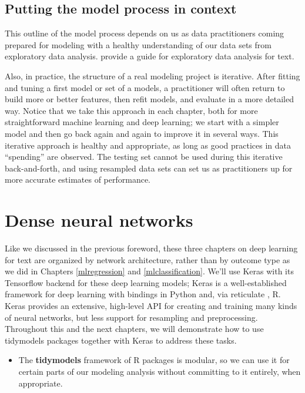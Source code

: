 \documentclass[
]{krantz}
\newenvironment{rmdblock}[1]
  {\begin{shaded*}
  \begin{itemize}[left = -1cm, labelsep = 1cm]
  \renewcommand{\labelitemi}{
    \raisebox{-.7\height}[0pt][0pt]{
      {\setkeys{Gin}{width=3em,keepaspectratio}\texttt{[image: images/\#1]}}
    }
  }
 
  \item
  }
  {
  \end{itemize}
  \end{shaded*}
  }
\newenvironment{rmdpackage}
  {\begin{rmdblock}{package}}
  {\end{rmdblock}}
\begin{document}
\hypertarget{putting-the-model-process-in-context}{%
\section*{Putting the model process in context}\label{putting-the-model-process-in-context}}


This outline of the model process depends on us as data practitioners coming prepared for modeling with a healthy understanding of our data sets from exploratory data analysis. \citet{Silge2017} provide a guide for exploratory data analysis for text.

Also, in practice, the structure of a real modeling project is iterative. After fitting and tuning a first model or set of a models, a practitioner will often return to build more or better features, then refit models, and evaluate in a more detailed way. Notice that we take this approach in each chapter, both for more straightforward machine learning and deep learning; we start with a simpler model and then go back again and again to improve it in several ways. This iterative approach is healthy and appropriate, as long as good practices in data ``spending'' are observed. The testing set cannot be used during this iterative back-and-forth, and using resampled data sets can set us as practitioners up for more accurate estimates of performance.

\thispagestyle{myheadings}

\hypertarget{dldnn}{%
\chapter{Dense neural networks}\label{dldnn}}

Like we discussed in the previous foreword, these three chapters on deep learning for text are organized by network architecture, rather than by outcome type as we did in Chapters \ref{mlregression} and \ref{mlclassification}.
We'll use Keras with its Tensorflow backend for these deep learning models; Keras is a well-established framework for deep learning with bindings in Python and, via reticulate \citep{R-reticulate}, R.
Keras provides an extensive, high-level API for creating and training many kinds of neural networks, but less support for resampling and preprocessing. Throughout this and the next chapters, we will demonstrate how to use tidymodels packages together with Keras to address these tasks.

\begin{rmdpackage}
The \textbf{tidymodels} framework of R packages is modular, so we can
use it for certain parts of our modeling analysis without committing to
it entirely, when appropriate.
\end{rmdpackage}
\end{document}
